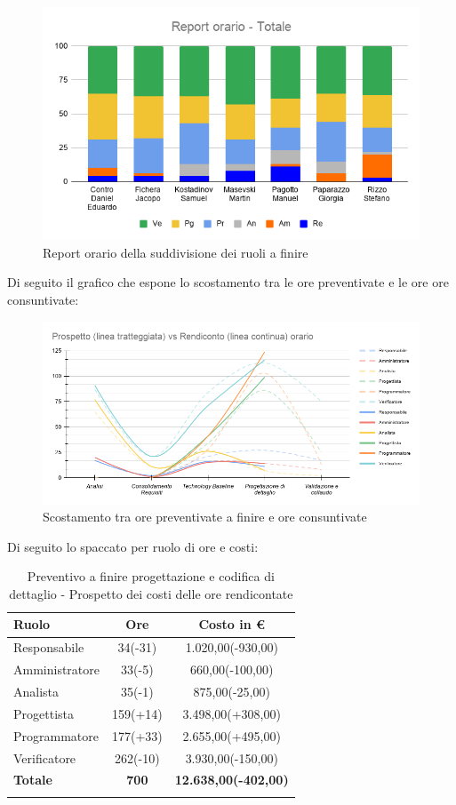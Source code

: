 \documentclass[../piano_di_progetto.tex]{subfiles}
\begin{document}
\begin{figure}[H]
	\centering
	\includegraphics[width=12cm]{src/img/report/Report_totale}
	\caption{Report orario della suddivisione dei ruoli a finire}
\end{figure}


Di seguito il grafico che espone lo scostamento tra le ore preventivate e le ore ore consuntivate:

\begin{figure}[H]
	\centering
	\includegraphics[width=17cm]{src/img/report/prospetto_ore_totale}
	\caption{Scostamento tra ore preventivate a finire e ore consuntivate}
\end{figure}

Di seguito lo spaccato per ruolo di ore e costi:
\begin{center}
	\begin{longtable}{|l|c|c|}
		\hline
		\rowcolor{lightgray}
		\textbf{Ruolo} & \textbf{Ore} & \textbf{Costo in €}\\
		\hline
		
		Responsabile & 34(-31) & 1.020,00(-930,00) \\
		Amministratore & 33(-5) & 660,00(-100,00) \\
		Analista & 35(-1) & 875,00(-25,00) \\
		Progettista & 159(+14) & 3.498,00(+308,00) \\
		Programmatore & 177(+33) & 2.655,00(+495,00) \\
		Verificatore & 262(-10) & 3.930,00(-150,00) \\
		\hline
		\textbf{Totale} & \textbf{700} & \textbf{12.638,00(-402,00)}\\
		\hline
		\rowcolor{white}
		\caption{Preventivo a finire progettazione e codifica di dettaglio - Prospetto dei costi delle ore rendicontate}
	\end{longtable}
\end{center}
\end{document}
